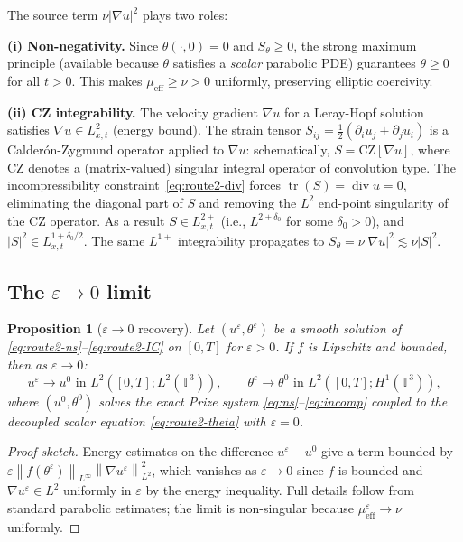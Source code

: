 \documentclass[11pt]{article}
\newtheorem{proposition}[theorem]{Proposition}
\theoremstyle{definition}
\newcommand{\T}{\mathbb{T}}
\newcommand{\norm}[1]{\left\|#1\right\|}
\newcommand{\abs}[1]{\left|#1\right|}
\newcommand{\grad}{\nabla}
\newcommand{\divg}{\operatorname{div}}
\newcommand{\eps}{\varepsilon}
\newcommand{\CZ}{\mathrm{CZ}}
\newcommand{\thetafield}{\theta}
\newcommand{\mueff}{\mu_{\mathrm{eff}}}
\begin{document}
The source term $\nu \abs{\grad u}^2$ plays two roles:

\medskip\noindent\textbf{(i) Non-negativity.} Since $\thetafield(\cdot,0) = 0$ and
$S_\theta \geq 0$, the strong maximum principle (available because $\thetafield$ satisfies
a \emph{scalar} parabolic PDE) guarantees $\thetafield \geq 0$ for all $t > 0$.
This makes $\mueff \geq \nu > 0$ uniformly, preserving elliptic coercivity.

\medskip\noindent\textbf{(ii) CZ integrability.} The velocity gradient $\grad u$ for a
Leray-Hopf solution satisfies $\grad u \in L^2_{x,t}$ (energy bound). The strain tensor
$S_{ij} = \tfrac{1}{2}(\partial_i u_j + \partial_j u_i)$ is a Calder\'on-Zygmund operator
applied to $\grad u$: schematically, $S = \CZ[\grad u]$, where CZ denotes a
(matrix-valued) singular integral operator of convolution type. The incompressibility
constraint~\eqref{eq:route2-div} forces $\operatorname{tr}(S) = \divg u = 0$, eliminating the
diagonal part of $S$ and removing the $L^2$ end-point singularity of the CZ operator.
As a result $S \in L^{2+}_{x,t}$ (i.e., $L^{2+\delta_0}$ for some $\delta_0 > 0$),
and $\abs{S}^2 \in L^{1+\delta_0/2}_{x,t}$. The same $L^{1+}$
integrability propagates to $S_\theta = \nu \abs{\grad u}^2 \lesssim \nu \abs{S}^2$.

\subsection{The $\eps \to 0$ limit}

\begin{proposition}[$\eps \to 0$ recovery]
\label{prop:eps-limit}
Let $(u^\eps, \thetafield^\eps)$ be a smooth solution of
\eqref{eq:route2-ns}--\eqref{eq:route2-IC} on $[0,T]$ for $\eps > 0$.
If $f$ is Lipschitz and bounded, then as $\eps \to 0$:
\begin{equation}
  u^\eps \to u^0 \text{ in } L^2([0,T];L^2(\T^3)), \qquad
  \thetafield^\eps \to \thetafield^0 \text{ in } L^2([0,T];H^1(\T^3)),
\end{equation}
where $(u^0, \thetafield^0)$ solves the exact Prize system \eqref{eq:ns}--\eqref{eq:incomp}
coupled to the decoupled scalar equation \eqref{eq:route2-theta} with $\eps = 0$.
\end{proposition}

\begin{proof}[Proof sketch]
Energy estimates on the difference $u^\eps - u^0$ give a term bounded by
$\eps \norm{f(\thetafield^\eps)}_{L^\infty} \norm{\grad u^\eps}_{L^2}^2$, which vanishes
as $\eps \to 0$ since $f$ is bounded and $\grad u^\eps \in L^2$ uniformly in $\eps$
by the energy inequality. Full details follow from standard parabolic estimates;
the limit is non-singular because $\mueff^\eps \to \nu$ uniformly.
\end{proof}
\end{document}
